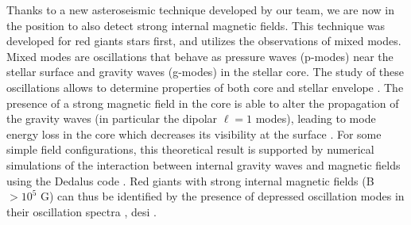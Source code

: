Thanks to a new asteroseismic technique developed by our team, we are now in the position to also detect strong internal magnetic fields.
This technique was developed for red giants stars first, and utilizes the observations of mixed modes. Mixed modes are
oscillations that behave as pressure waves (p-modes) near the stellar surface and gravity waves (g-modes) in the stellar core.
The study of these oscillations allows to determine properties of both core and stellar envelope \citep[e.g][]{Beck_2011}.
The presence of a strong magnetic field in the core is able to alter the propagation of the gravity waves (in particular the dipolar $\ell =1$ modes),
leading to mode energy loss in the core which decreases its visibility at the surface \citep{Fuller_2015}.
For some simple field configurations, this theoretical result is supported  by numerical simulations of the interaction between
internal gravity waves and magnetic fields using the Dedalus code \citep{Lecoanet_2016}.
Red giants with strong internal magnetic fields (B $> 10^5$ G) can thus be identified by the presence of depressed oscillation modes in their oscillation spectra \citep{Fuller_2015,Stello_2016}, desi \citet{Mosser_2017}.
